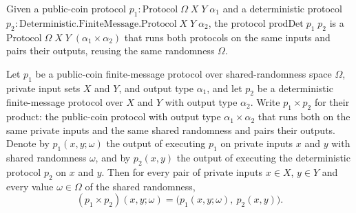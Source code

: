 \begin{definition}
\label{CommunicationComplexity.PublicCoin.FiniteMessage.Protocol.prodDet}
\leanok
{}
Given a public-coin protocol $p_1 : \mathrm{Protocol}\;\Omega\;X\;Y\;\alpha_1$ and a
deterministic protocol $p_2 : \mathrm{Deterministic.FiniteMessage.Protocol}\;X\;Y\;\alpha_2$,
the protocol $\mathrm{prodDet}\;p_1\;p_2$ is a $\mathrm{Protocol}\;\Omega\;X\;Y\;(\alpha_1 \times \alpha_2)$
that runs both protocols on the same inputs and pairs their outputs,
reusing the same randomness $\Omega$.
\end{definition}

\begin{theorem}
\label{CommunicationComplexity.PublicCoin.FiniteMessage.Protocol.prodDet_rrun}
\leanok
{}
Let $p_1$ be a public-coin finite-message protocol over shared-randomness space
$\Omega$, private input sets $X$ and $Y$, and output type $\alpha_1$, and let $p_2$ be a
deterministic finite-message protocol over $X$ and $Y$ with output type $\alpha_2$.
Write $p_1 \times p_2$ for their product: the public-coin protocol with output type
$\alpha_1 \times \alpha_2$ that runs both on the same private inputs and the same shared
randomness and pairs their outputs. Denote by $p_1(x, y; \omega)$ the output of
executing $p_1$ on private inputs $x$ and $y$ with shared randomness $\omega$, and by
$p_2(x, y)$ the output of executing the deterministic protocol $p_2$ on $x$ and $y$.
Then for every pair of private inputs $x \in X$, $y \in Y$ and every value $\omega \in
\Omega$ of the shared randomness,
\[ (p_1 \times p_2)(x, y; \omega) = \big(p_1(x, y; \omega),\ p_2(x, y)\big). \]
\end{theorem}

